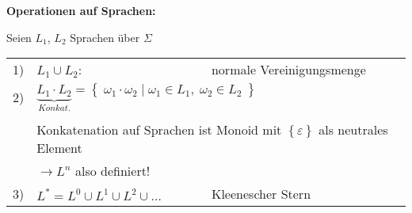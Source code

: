 \documentclass[
	final,
	a4paper,
	oneside,
	parskip=full,
	headings=standardclasses,
	headings=big,
	pointednumbers
]{scrartcl}
\def\myident{3cm}
\def\mysep{0pt}
\def\myrule{0pt}
\newenvironment{MyDef}
[2]
{%
    \setlength{\fboxsep}{\mysep}
    \setlength{\fboxrule}{\myrule}
    \hspace{-\myident}\fbox{\begin{minipage}[t]{\myident}\vspace{-0.5cm}\par\rule{\textwidth}{0.4pt}\par\hfill\textbf{#2}\enskip\,\end{minipage}}\begin{lrbox}{\mybox}\begin{minipage}[t]{\textwidth}\vspace{#1}
}
{%
    \end{minipage}\end{lrbox}\fbox{\usebox{\mybox}}
}
\begin{document}
    \begin{MyDef}{-0.26cm}{Def.}
        \textbf{Operationen auf Sprachen:}
        
        Seien $L_1$, $L_2$ Sprachen über $\Sigma$
        
        \hspace{-0.3cm}
        \begin{tabular}{lll}
            1) & $ L_1 \cup L_2 $: & normale Vereinigungsmenge \\
            2) & \multicolumn{2}{l}{$ \underbrace{L_1 \cdot L_2}_{Konkat.} =
                \left\{ \; \omega_1 \cdot \omega_2 \mid \omega_1 \in L_1, \; \omega_2 \in L_2 \; \right\} $} \\
               & & \\
               & \multicolumn{2}{l}{Konkatenation auf Sprachen ist Monoid mit $\left\{ \varepsilon \right\} $ als neutrales Element} \\
               & \multicolumn{2}{l}{$\to L^n$ also definiert! } \\
            3) & $L^* = L^0 \cup L^1 \cup L^2 \cup \ldots$ & Kleenescher Stern
        \end{tabular}
    \end{MyDef}
    
\end{document}
